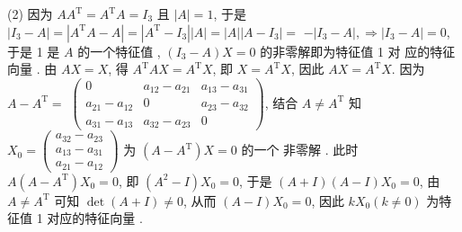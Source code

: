 \documentclass[10pt]{article}
\begin{document}
(2)  因为  $A A^{\mathrm{T}}=A^{\mathrm{T}} A=I_{3}$  且  $|A|=1$,  于是  $\left|I_{3}-A\right|=\left|A^{\mathrm{T}} A-A\right|=\left|A^{\mathrm{T}}-I_{3}\right||A|=|A|\left|A-I_{3}\right|=$ $-\left|I_{3}-A\right|, \Longrightarrow\left|I_{3}-A\right|=0$,  于是  1  是  $A$  的一个特征值 , $\left(I_{3}-A\right) X=0$  的非零解即为特征值  1  对   应的特征向量 .  由  $A X=X$,  得  $A^{\mathrm{T}} A X=A^{\mathrm{T}} X$,  即  $X=A^{\mathrm{T}} X$,  因此  $A X=A^{\mathrm{T}} X$.  因为  $A-A^{\mathrm{T}}=$ $\left(\begin{array}{ccc}0 & a_{12}-a_{21} & a_{13}-a_{31} \\ a_{21}-a_{12} & 0 & a_{23}-a_{32} \\ a_{31}-a_{13} & a_{32}-a_{23} & 0\end{array}\right)$,  结合  $A \neq A^{\mathrm{T}}$  知  $X_{0}=\left(\begin{array}{l}a_{32}-a_{23} \\ a_{13}-a_{31} \\ a_{21}-a_{12}\end{array}\right)$  为  $\left(A-A^{\mathrm{T}}\right) X=0$  的一个   非零解 .  此时  $A\left(A-A^{\mathrm{T}}\right) X_{0}=0$,  即  $\left(A^{2}-I\right) X_{0}=0$,  于是  $(A+I)(A-I) X_{0}=0$,  由  $A \neq A^{\mathrm{T}}$  可知  $\operatorname{det}(A+I) \neq 0$,  从而  $(A-I) X_{0}=0$,  因此  $k X_{0}(k \neq 0)$  为特征值  1  对应的特征向量 .
\end{document}
